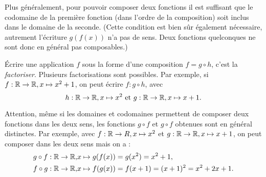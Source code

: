 Plus généralement, pour pouvoir composer deux fonctions il est suffisant que le codomaine de la première fonction (dans l'ordre de la composition) soit inclus dans le domaine de la seconde. (Cette condition est bien sûr également nécessaire, autrement l'écriture $g(f(x))$ n'a pas de sens. Deux fonctions quelconques ne sont donc en général pas composables.)

\begin{definition}
\'Ecrire une application $f$ sous la forme d'une composition $f = g\circ h$, c'est la \emph{factoriser}. Plusieurs factorisations sont possibles. Par exemple, si $f : \mathbb{R}\to \mathbb{R}, x\mapsto x^2+1$, on peut écrire $f : g\circ h$, avec
\[
h : \mathbb{R}\to \mathbb{R}, x\mapsto x^2 
\text{ et }
g : \mathbb{R}\to \mathbb{R}, x\mapsto x+1.
\]
\end{definition}

\noindent{}


\begin{attention}
Attention, même si les domaines et codomaines permettent de composer deux fonctions dans les deux sens, les fonctions $g\circ f$ et $g\circ f$ obtenues sont en général distinctes. Par exemple, avec $f : \mathbb{R}\to R, x\mapsto x^2
$ et $g : \mathbb{R}\to \mathbb{R}, x\mapsto x+1$,  on peut composer dans les deux sens mais on a :
\begin{align*}
g\circ f : \mathbb{R}\to \mathbb{R}, & x\mapsto g(f(x)) = g(x^2) = x^2+1,\\
f\circ g : \mathbb{R}\to \mathbb{R}, & x\mapsto f(g(x)) = f(x+1) = (x+1)^2 = x^2+2x+1.
\end{align*}
\end{attention}


